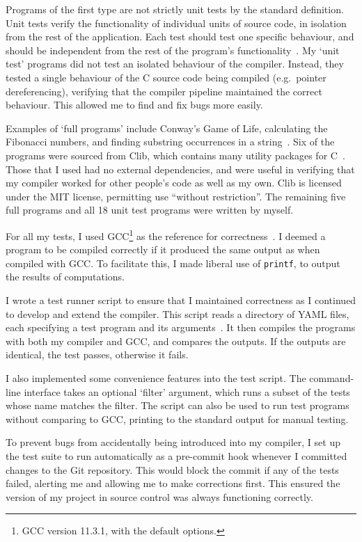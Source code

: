 \documentclass[00-main.tex]{subfiles}
\begin{document}
Programs of the first type are not strictly unit tests by the standard definition.
Unit tests verify the functionality of individual units of source code, in isolation from the rest of the application.
Each test should test one specific behaviour, and should be independent from the rest of the program's functionality~.
My `unit test' programs did not test an isolated behaviour of the compiler.
Instead, they tested a single behaviour of the C source code being compiled (e.g.~pointer dereferencing), verifying that the compiler pipeline maintained the correct behaviour.
This allowed me to find and fix bugs more easily.

Examples of `full programs' include Conway's Game of Life, calculating the Fibonacci numbers, and finding substring occurrences in a string~.
Six of the programs were sourced from Clib, which contains many utility packages for C~.
Those that I used had no external dependencies, and were useful in verifying that my compiler worked for other people's code as well as my own.
Clib is licensed under the MIT license, permitting use ``without restriction''.
The remaining five full programs and all 18 unit test programs were written by myself.

For all my tests, I used GCC\footnote{GCC version 11.3.1, with the default options.} as the reference for correctness~.
I deemed a program to be compiled correctly if it produced the same output as when compiled with GCC\@.
To facilitate this, I made liberal use of \texttt{printf}, to output the results of computations.

I wrote a test runner script to ensure that I maintained correctness as I continued to develop and extend the compiler.
This script reads a directory of YAML files, each specifying a test program and its arguments~.
It then compiles the programs with both my compiler and GCC, and compares the outputs.
If the outputs are identical, the test passes, otherwise it fails.

I also implemented some convenience features into the test script.
The command-line interface takes an optional `filter' argument, which runs a subset of the tests whose name matches the filter.
The script can also be used to run test programs without comparing to GCC, printing to the standard output for manual testing.

To prevent bugs from accidentally being introduced into my compiler, I set up the test suite to run automatically as a pre-commit hook whenever I committed changes to the Git repository.
This would block the commit if any of the tests failed, alerting me and allowing me to make corrections first.
This ensured the version of my project in source control was always functioning correctly.
\end{document}
